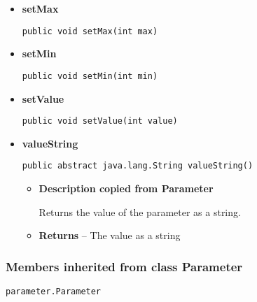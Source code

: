 {{{{{{{{\begin{itemize}
{\begin{itemize}
{Returns the value of the parameter.
}
\item{{\bf  Returns} -- 
The current value of the parameter 
}%
\end{itemize}
}%
\item{ 
{\bf  setMax}\\
\begin{lstlisting}[frame=none]
public void setMax(int max)\end{lstlisting} %
}%
\item{ 
{\bf  setMin}\\
\begin{lstlisting}[frame=none]
public void setMin(int min)\end{lstlisting} %
}%
\item{ 
{\bf  setValue}\\
\begin{lstlisting}[frame=none]
public void setValue(int value)\end{lstlisting} %
}%
\item{ 
{\bf  valueString}\\
\begin{lstlisting}[frame=none]
public abstract java.lang.String valueString()\end{lstlisting} %
\begin{itemize}
\item{
{\bf  Description copied from Parameter{\small {}} }

Returns the value of the parameter as a string.
}
\item{{\bf  Returns} -- 
The value as a string 
}%
\end{itemize}
}%
\end{itemize}
}
\subsubsection{Members inherited from class Parameter }{
\texttt{parameter.Parameter} {\small 
{}}
{\small 

}}}}}}}}}

